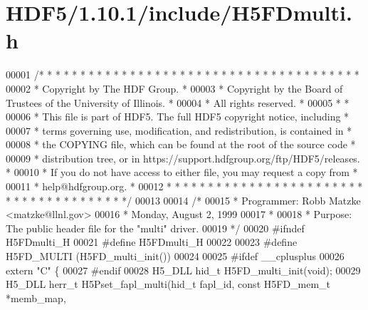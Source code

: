 \hypertarget{_h_d_f5_21_810_81_2include_2_h5_f_dmulti_8h_source}{}\section{H\+D\+F5/1.10.1/include/\+H5\+F\+Dmulti.h}
\label{_h_d_f5_21_810_81_2include_2_h5_f_dmulti_8h_source}

\begin{DoxyCode}
00001 \textcolor{comment}{/* * * * * * * * * * * * * * * * * * * * * * * * * * * * * * * * * * * * * * *}
00002 \textcolor{comment}{ * Copyright by The HDF Group.                                               *}
00003 \textcolor{comment}{ * Copyright by the Board of Trustees of the University of Illinois.         *}
00004 \textcolor{comment}{ * All rights reserved.                                                      *}
00005 \textcolor{comment}{ *                                                                           *}
00006 \textcolor{comment}{ * This file is part of HDF5.  The full HDF5 copyright notice, including     *}
00007 \textcolor{comment}{ * terms governing use, modification, and redistribution, is contained in    *}
00008 \textcolor{comment}{ * the COPYING file, which can be found at the root of the source code       *}
00009 \textcolor{comment}{ * distribution tree, or in https://support.hdfgroup.org/ftp/HDF5/releases.  *}
00010 \textcolor{comment}{ * If you do not have access to either file, you may request a copy from     *}
00011 \textcolor{comment}{ * help@hdfgroup.org.                                                        *}
00012 \textcolor{comment}{ * * * * * * * * * * * * * * * * * * * * * * * * * * * * * * * * * * * * * * */}
00013 
00014 \textcolor{comment}{/*}
00015 \textcolor{comment}{ * Programmer:  Robb Matzke <matzke@llnl.gov>}
00016 \textcolor{comment}{ *              Monday, August  2, 1999}
00017 \textcolor{comment}{ *}
00018 \textcolor{comment}{ * Purpose: The public header file for the "multi" driver.}
00019 \textcolor{comment}{ */}
00020 \textcolor{preprocessor}{#ifndef H5FDmulti\_H}
00021 \textcolor{preprocessor}{#define H5FDmulti\_H}
00022 
00023 \textcolor{preprocessor}{#define H5FD\_MULTI  (H5FD\_multi\_init())}
00024 
00025 \textcolor{preprocessor}{#ifdef \_\_cplusplus}
00026 \textcolor{keyword}{extern} \textcolor{stringliteral}{"C"} \{
00027 \textcolor{preprocessor}{#endif}
00028 H5\_DLL hid\_t H5FD\_multi\_init(\textcolor{keywordtype}{void});
00029 H5\_DLL herr\_t H5Pset\_fapl\_multi(hid\_t fapl\_id, \textcolor{keyword}{const} H5FD\_mem\_t *memb\_map,

\end{DoxyCode}
